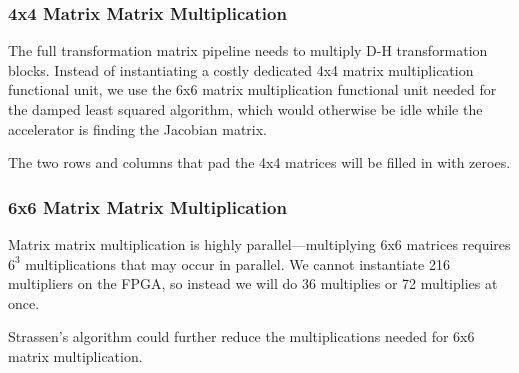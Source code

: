 \subsubsection{4x4 Matrix Matrix Multiplication}
The full transformation matrix pipeline needs to multiply D-H transformation blocks. Instead of instantiating a costly dedicated 4x4 matrix multiplication functional unit, we use the 6x6 matrix multiplication functional unit needed for the damped least squared algorithm, which would otherwise be idle while the accelerator is finding the Jacobian matrix.

The two rows and columns that pad the 4x4 matrices will be filled in with zeroes.

\subsubsection{6x6 Matrix Matrix Multiplication}
Matrix matrix multiplication is highly parallel---multiplying 6x6 matrices requires $6^3$ multiplications that may occur in parallel. We cannot instantiate 216 multipliers on the FPGA, so instead we will do 36 multiplies or 72 multiplies at once.

Strassen's algorithm could further reduce the multiplications needed for 6x6 matrix multiplication.